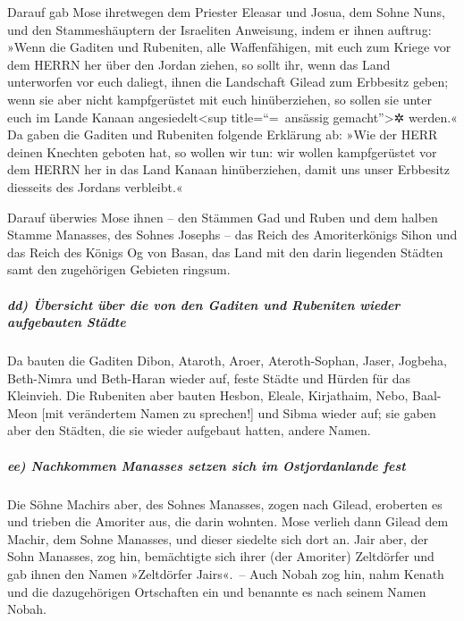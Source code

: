 Darauf gab Mose ihretwegen dem Priester Eleasar und
Josua, dem Sohne Nuns, und den Stammeshäuptern der Israeliten Anweisung,
indem er ihnen auftrug: »Wenn die Gaditen und Rubeniten,
alle Waffenfähigen, mit euch zum Kriege vor dem HERRN her über den
Jordan ziehen, so sollt ihr, wenn das Land unterworfen vor euch daliegt,
ihnen die Landschaft Gilead zum Erbbesitz geben; wenn sie
aber nicht kampfgerüstet mit euch hinüberziehen, so sollen sie unter
euch im Lande Kanaan angesiedelt\textless sup title=``=~ansässig
gemacht''\textgreater✲ werden.« Da gaben die Gaditen und
Rubeniten folgende Erklärung ab: »Wie der HERR deinen Knechten geboten
hat, so wollen wir tun: wir wollen kampfgerüstet vor dem
HERRN her in das Land Kanaan hinüberziehen, damit uns unser Erbbesitz
diesseits des Jordans verbleibt.«

Darauf überwies Mose ihnen -- den Stämmen Gad und Ruben
und dem halben Stamme Manasses, des Sohnes Josephs -- das Reich des
Amoriterkönigs Sihon und das Reich des Königs Og von Basan, das Land mit
den darin liegenden Städten samt den zugehörigen Gebieten ringsum.

\hypertarget{dd-uxfcbersicht-uxfcber-die-von-den-gaditen-und-rubeniten-wieder-aufgebauten-stuxe4dte}{%
\subparagraph{dd) Übersicht über die von den Gaditen und Rubeniten
wieder aufgebauten
Städte}\label{dd-uxfcbersicht-uxfcber-die-von-den-gaditen-und-rubeniten-wieder-aufgebauten-stuxe4dte}}

Da bauten die Gaditen Dibon, Ataroth, Aroer,
Ateroth-Sophan, Jaser, Jogbeha, Beth-Nimra
und Beth-Haran wieder auf, feste Städte und Hürden für das Kleinvieh.
Die Rubeniten aber bauten Hesbon, Eleale, Kirjathaim,
Nebo, Baal-Meon {[}mit verändertem Namen zu sprechen!{]}
und Sibma wieder auf; sie gaben aber den Städten, die sie wieder
aufgebaut hatten, andere Namen.

\hypertarget{ee-nachkommen-manasses-setzen-sich-im-ostjordanlande-fest}{%
\subparagraph{ee) Nachkommen Manasses setzen sich im Ostjordanlande
fest}\label{ee-nachkommen-manasses-setzen-sich-im-ostjordanlande-fest}}

Die Söhne Machirs aber, des Sohnes Manasses, zogen nach
Gilead, eroberten es und trieben die Amoriter aus, die darin wohnten.
Mose verlieh dann Gilead dem Machir, dem Sohne Manasses,
und dieser siedelte sich dort an. Jair aber, der Sohn
Manasses, zog hin, bemächtigte sich ihrer (der Amoriter) Zeltdörfer und
gab ihnen den Namen »Zeltdörfer Jairs«.~-- Auch Nobah zog
hin, nahm Kenath und die dazugehörigen Ortschaften ein und benannte es
nach seinem Namen Nobah.

